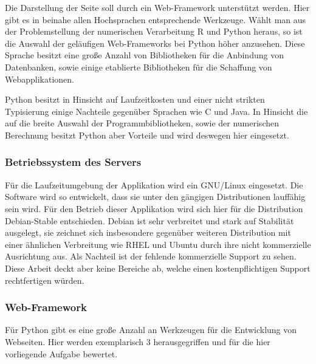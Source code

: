 Die Darstellung der Seite soll durch ein Web-\gls{Framework} unterstützt werden. Hier gibt es in beinahe allen Hochsprachen entsprechende Werkzeuge. Wählt man aus der Problemstellung der numerischen Verarbeitung R und Python heraus, so ist die Auswahl der geläufigen Web-Frameworks bei Python höher anzusehen. Diese Sprache besitzt eine große Anzahl von Bibliotheken für die Anbindung von Datenbanken, sowie einige etablierte Bibliotheken für die Schaffung von Webapplikationen.

Python besitzt in Hinsicht auf Laufzeitkosten und einer nicht strikten Typisierung einige Nachteile gegenüber Sprachen wie C und Java. In Hinsicht die auf die breite Auswahl der  Programmbibliotheken, sowie der numerischen Berechnung besitzt Python aber Vorteile und wird deswegen hier eingesetzt.



\subsubsection{Betriebssystem des Servers}


Für die Laufzeitumgebung der Applikation wird ein GNU/Linux eingesetzt. Die Software wird so entwickelt, dass sie unter den gängigen Distributionen lauffähig sein wird. Für den Betrieb dieser Applikation wird sich hier für die Distribution Debian-Stable entschieden. Debian ist sehr verbreitet und stark auf Stabilität ausgelegt, sie zeichnet sich insbesondere gegenüber weiteren Distribution mit einer ähnlichen Verbreitung wie RHEL und Ubuntu durch ihre nicht kommerzielle Ausrichtung aus.  Als Nachteil ist der fehlende kommerzielle Support zu sehen. Diese Arbeit deckt aber keine Bereiche ab, welche einen kostenpflichtigen Support rechtfertigen würden.

\subsubsection{Web-Framework}

Für Python gibt es eine große Anzahl an Werkzeugen für die Entwicklung von Webseiten. Hier werden exemplarisch 3 herausgegriffen und für die hier vorliegende Aufgabe bewertet.

